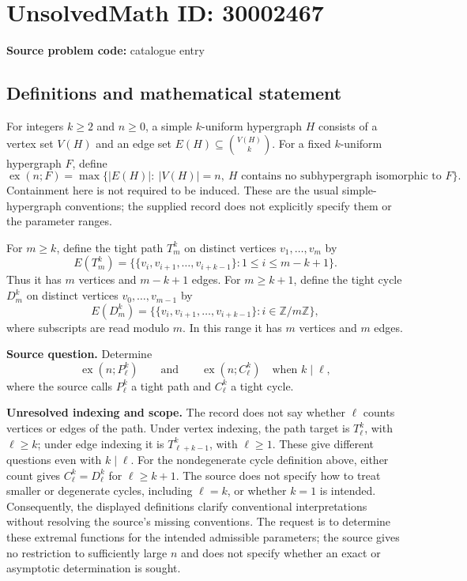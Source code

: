 \documentclass[11pt]{article}
\newcommand{\Z}{\mathbb{Z}}
\begin{document}
\section*{UnsolvedMath ID: 30002467}
\textbf{Source problem code:} catalogue entry
\subsection{Definitions and mathematical statement}
For integers \(k\ge 2\) and \(n\ge 0\), a simple \(k\)-uniform hypergraph \(H\) consists of a vertex set \(V(H)\) and an edge set \(E(H)\subseteq\binom{V(H)}{k}\). For a fixed \(k\)-uniform hypergraph \(F\), define
\[
\operatorname{ex}(n;F)=\max\bigl\{|E(H)|:\ |V(H)|=n,\ H\text{ contains no subhypergraph isomorphic to }F\bigr\}.
\]
Containment here is not required to be induced. These are the usual simple-hypergraph conventions; the supplied record does not explicitly specify them or the parameter ranges.

For \(m\ge k\), define the tight path \(T_m^k\) on distinct vertices \(v_1,\ldots,v_m\) by
\[
E(T_m^k)=\bigl\{\{v_i,v_{i+1},\ldots,v_{i+k-1}\}:1\le i\le m-k+1\bigr\}.
\]
Thus it has \(m\) vertices and \(m-k+1\) edges. For \(m\ge k+1\), define the tight cycle \(D_m^k\) on distinct vertices \(v_0,\ldots,v_{m-1}\) by
\[
E(D_m^k)=\bigl\{\{v_i,v_{i+1},\ldots,v_{i+k-1}\}:i\in\Z/m\Z\bigr\},
\]
where subscripts are read modulo \(m\). In this range it has \(m\) vertices and \(m\) edges.

\textbf{Source question.} Determine
\[
\operatorname{ex}(n;P_\ell^k)\qquad\text{and}\qquad\operatorname{ex}(n;C_\ell^k)
\quad\text{when }k\mid\ell,
\]
where the source calls \(P_\ell^k\) a tight path and \(C_\ell^k\) a tight cycle.

\textbf{Unresolved indexing and scope.} The record does not say whether \(\ell\) counts vertices or edges of the path. Under vertex indexing, the path target is \(T_\ell^k\), with \(\ell\ge k\); under edge indexing it is \(T_{\ell+k-1}^k\), with \(\ell\ge1\). These give different questions even with \(k\mid\ell\). For the nondegenerate cycle definition above, either count gives \(C_\ell^k=D_\ell^k\) for \(\ell\ge k+1\). The source does not specify how to treat smaller or degenerate cycles, including \(\ell=k\), or whether \(k=1\) is intended. Consequently, the displayed definitions clarify conventional interpretations without resolving the source's missing conventions. The request is to determine these extremal functions for the intended admissible parameters; the source gives no restriction to sufficiently large \(n\) and does not specify whether an exact or asymptotic determination is sought.
\end{document}
